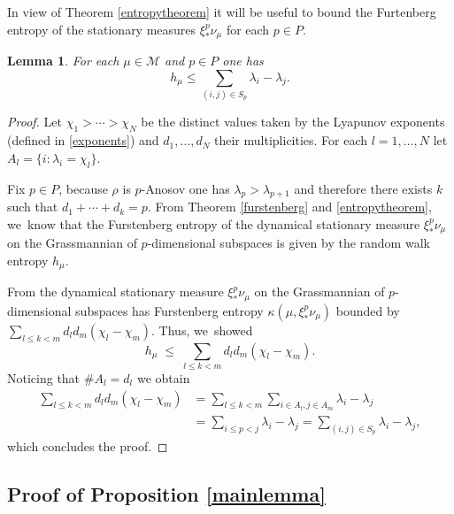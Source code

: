 \documentclass[JEP,XML,SOM,Unicode,NoEqCountersInSection,published]{cedram}
\newtheorem{lemma}[theorem]{Lemma}
\newcommand{\M}{\mathcal M}
\begin{document}
In view of Theorem \ref{entropytheorem} it will be useful to bound the Furtenberg entropy of the stationary measures \(\xi^p_*\nu_\mu\) for each \(p \in P\).

\begin{lemma}\label{entropyupperboundlemma}
For each \(\mu \in \M\) and \(p \in P\) one has
\[
h_\mu \le \sum_{(i,j) \in S_p}\lambda_i - \lambda_j.
\]
\end{lemma}
\begin{proof}
Let \(\chi_1 > \cdots > \chi_N\) be the distinct values taken by the Lyapunov exponents (defined in \eqref{exponents}) and \(d_1,\ldots, d_N\) their multiplicities. For each \(l = 1,\ldots, N\) let
\hbox{\(A_l = \lbrace i: \lambda_i = \chi_l\rbrace\)}.

Fix \(p \in P\), because \(\rho\) is \(p\)-Anosov one has \(\lambda_{p} > \lambda_{p+1}\) and therefore there exists \(k\) such that \(d_1 + \cdots + d_k = p\). From Theorem \ref{furstenberg} and \ref{entropytheorem}, we~know that the Furstenberg entropy of the dynamical stationary measure \(\xi^p_*\nu_\mu\) on the Grassmannian of \(p\)\nobreakdash-dimensional subspaces is given by the random walk entropy \(h_\mu\).

From \cite[Th.\,2.1]{LL23} the dynamical stationary measure \(\xi^p_*\nu_\mu\) on the Grassmannian of \(p\)-dimensional subspaces has Furstenberg entropy \(\kappa(\mu,\xi^p_*\nu_\mu)\) bounded by \(\sum_{l \le k < m}d_l d_m(\chi_l - \chi_m)\). Thus, we~showed
\[
h_\mu \; \le \; \sum_{l \le k < m}d_l d_m(\chi_l - \chi_m).
\]
Noticing that \(\#A_l = d_l\) we obtain
\begin{align*}
\sum_{l \le k < m}d_l d_m(\chi_l - \chi_m) &= \sum_{l \le k < m}\sum_{i \in A_l,j \in A_m}\lambda_i - \lambda_j
\\ &= \sum_{i \le p < j}\lambda_i - \lambda_j
= \sum_{(i,j) \in S_p}\lambda_i - \lambda_j,
\end{align*}
which concludes the proof.
\end{proof}

\subsection{Proof of Proposition \ref{mainlemma}}
\end{document}
